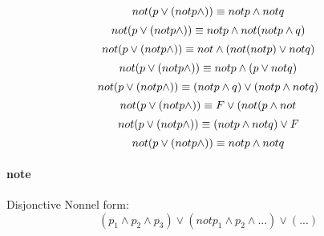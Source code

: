 \documentclass[a4paper,10pt]{article}
\begin{document}
\[ not(p\vee (not\\ p \wedge)) \equiv\\ not\\ p\wedge \\not\\ q\]
\[ not(p\vee (not\\ p \wedge)) \equiv\\ not\\ p\wedge \\not\\ (not\\ p \wedge q)\]
\[ not(p\vee (not\\ p \wedge)) \equiv\\ not \wedge ( \\not (not\\ p)\vee \\not\\ q)\]
\[ not(p\vee (not\\ p \wedge)) \equiv\\ not\\ p \wedge(p \vee \\not\\ q)\]
\[ not(p\vee (not\\ p \wedge)) \equiv\\ (not\\ p \wedge q) \vee (not\\ p \wedge not\\ q)\]
\[ not(p\vee (not\\ p \wedge)) \equiv\\ F \vee (not(p \wedge \\not \]
\[ not(p\vee (not\\ p \wedge)) \equiv\\ (not\\ p \wedge \\not\\ q) \vee F\]
\[ not(p\vee (not\\ p \wedge)) \equiv\\ not\\ p \wedge \\not\\ q \]

\paragraph{note}
Disjonctive Nonnel form:
\[(p_1\wedge p_2\wedge p_3)\vee (notp_1 \wedge p_2 \wedge ...)\vee (...)\]
\end{document}
